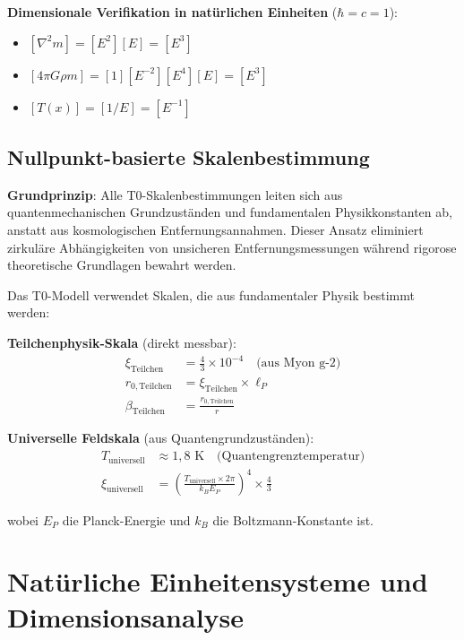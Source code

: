 \documentclass[12pt,a4paper]{article}
\newcommand{\Tfield}{T(x)}
\begin{document}
	\textbf{Dimensionale Verifikation in nat\"urlichen Einheiten} ($\hbar = c = 1$):
	\begin{itemize}
		\item $[\nabla^2 m] = [E^2][E] = [E^3]$
		\item $[4\pi G \rho m] = [1][E^{-2}][E^4][E] = [E^3]$ \checkmark
		\item $[\Tfield] = [1/E] = [E^{-1}]$ \checkmark
	\end{itemize}
	
	\subsection{Nullpunkt-basierte Skalenbestimmung}
	\label{subsec:nullpoint_methodology}
	
	\begin{tcolorbox}[colback=orange!5!white,colframe=orange!75!black,title=Nullpunkt-basierte universelle Methodik]
		\textbf{Grundprinzip}: Alle T0-Skalenbestimmungen leiten sich aus quantenmechanischen Grundzust\"anden und fundamentalen Physikkonstanten ab, anstatt aus kosmologischen Entfernungsannahmen. Dieser Ansatz eliminiert zirkul\"are Abh\"angigkeiten von unsicheren Entfernungsmessungen w\"ahrend rigorose theoretische Grundlagen bewahrt werden.
	\end{tcolorbox}
	
	Das T0-Modell verwendet Skalen, die aus fundamentaler Physik bestimmt werden:
	
	\textbf{Teilchenphysik-Skala} (direkt messbar):
	\begin{align}
		\xi_{\text{Teilchen}} &= \frac{4}{3} \times 10^{-4} \quad \text{(aus Myon g-2)} \\
		r_{0,\text{Teilchen}} &= \xi_{\text{Teilchen}} \times \ell_P \\
		\beta_{\text{Teilchen}} &= \frac{r_{0,\text{Teilchen}}}{r}
	\end{align}
	
	\textbf{Universelle Feldskala} (aus Quantengrundzust\"anden):
	\begin{align}
		T_{\text{universell}} &\approx 1{,}8 \text{ K} \quad \text{(Quantengrenztemperatur)} \\
		\xi_{\text{universell}} &= \left(\frac{T_{\text{universell}} \times 2\pi}{k_B E_P}\right)^4 \times \frac{4}{3}
	\end{align}
	
	wobei $E_P$ die Planck-Energie und $k_B$ die Boltzmann-Konstante ist.
	
	\section{Nat\"urliche Einheitensysteme und Dimensionsanalyse}
	\label{sec:natural_units}
	
\end{document}
